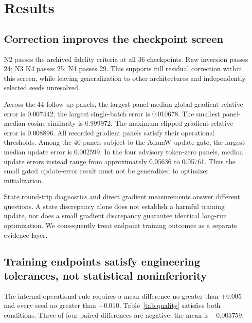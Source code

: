 \documentclass[10pt]{article}
\begin{document}
\section{Results}
\subsection{Correction improves the checkpoint screen}
N2 passes the archived fidelity criteria at all 36 checkpoints. Raw inversion passes 24; N3 K4 passes 25; N4 passes 29. This supports full residual correction within this screen, while leaving generalization to other architectures and independently selected seeds unresolved.

Across the 44 follow-up panels, the largest panel-median global-gradient relative error is 0.007442; the largest single-batch error is 0.010678. The smallest panel-median cosine similarity is 0.999972. The maximum clipped-gradient relative error is 0.008896. All recorded gradient panels satisfy their operational thresholds. Among the 40 panels subject to the AdamW update gate, the largest median update error is 0.002599. In the four advisory token-zero panels, median update errors instead range from approximately 0.05636 to 0.05761. Thus the small gated update-error result must not be generalized to optimizer initialization.

State round-trip diagnostics and direct gradient measurements answer different questions. A state discrepancy alone does not establish a harmful training update, nor does a small gradient discrepancy guarantee identical long-run optimization. We consequently treat endpoint training outcomes as a separate evidence layer.

\subsection{Training endpoints satisfy engineering tolerances, not statistical noninferiority}
\begin{table}[ht]
\centering

\caption{Paired validation endpoints after approximately 50 million training tokens. Negative differences favor N2. The exact reference uses the same forward architecture.}
\label{tab:quality}
\end{table}

The internal operational rule requires a mean difference no greater than $+0.005$ and every seed no greater than $+0.010$. Table~\ref{tab:quality} satisfies both conditions. Three of four paired differences are negative; the mean is $-0.003759$.
\end{document}
